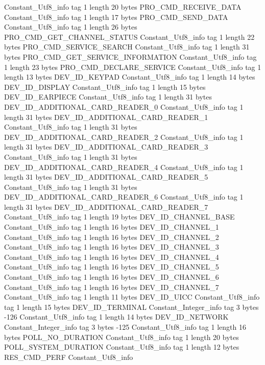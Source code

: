 {{{		}
		Constant_Utf8_info {
			tag	1
			length	20
			bytes	PRO_CMD_RECEIVE_DATA
		}
		Constant_Utf8_info {
			tag	1
			length	17
			bytes	PRO_CMD_SEND_DATA
		}
		Constant_Utf8_info {
			tag	1
			length	26
			bytes	PRO_CMD_GET_CHANNEL_STATUS
		}
		Constant_Utf8_info {
			tag	1
			length	22
			bytes	PRO_CMD_SERVICE_SEARCH
		}
		Constant_Utf8_info {
			tag	1
			length	31
			bytes	PRO_CMD_GET_SERVICE_INFORMATION
		}
		Constant_Utf8_info {
			tag	1
			length	23
			bytes	PRO_CMD_DECLARE_SERVICE
		}
		Constant_Utf8_info {
			tag	1
			length	13
			bytes	DEV_ID_KEYPAD
		}
		Constant_Utf8_info {
			tag	1
			length	14
			bytes	DEV_ID_DISPLAY
		}
		Constant_Utf8_info {
			tag	1
			length	15
			bytes	DEV_ID_EARPIECE
		}
		Constant_Utf8_info {
			tag	1
			length	31
			bytes	DEV_ID_ADDITIONAL_CARD_READER_0
		}
		Constant_Utf8_info {
			tag	1
			length	31
			bytes	DEV_ID_ADDITIONAL_CARD_READER_1
		}
		Constant_Utf8_info {
			tag	1
			length	31
			bytes	DEV_ID_ADDITIONAL_CARD_READER_2
		}
		Constant_Utf8_info {
			tag	1
			length	31
			bytes	DEV_ID_ADDITIONAL_CARD_READER_3
		}
		Constant_Utf8_info {
			tag	1
			length	31
			bytes	DEV_ID_ADDITIONAL_CARD_READER_4
		}
		Constant_Utf8_info {
			tag	1
			length	31
			bytes	DEV_ID_ADDITIONAL_CARD_READER_5
		}
		Constant_Utf8_info {
			tag	1
			length	31
			bytes	DEV_ID_ADDITIONAL_CARD_READER_6
		}
		Constant_Utf8_info {
			tag	1
			length	31
			bytes	DEV_ID_ADDITIONAL_CARD_READER_7
		}
		Constant_Utf8_info {
			tag	1
			length	19
			bytes	DEV_ID_CHANNEL_BASE
		}
		Constant_Utf8_info {
			tag	1
			length	16
			bytes	DEV_ID_CHANNEL_1
		}
		Constant_Utf8_info {
			tag	1
			length	16
			bytes	DEV_ID_CHANNEL_2
		}
		Constant_Utf8_info {
			tag	1
			length	16
			bytes	DEV_ID_CHANNEL_3
		}
		Constant_Utf8_info {
			tag	1
			length	16
			bytes	DEV_ID_CHANNEL_4
		}
		Constant_Utf8_info {
			tag	1
			length	16
			bytes	DEV_ID_CHANNEL_5
		}
		Constant_Utf8_info {
			tag	1
			length	16
			bytes	DEV_ID_CHANNEL_6
		}
		Constant_Utf8_info {
			tag	1
			length	16
			bytes	DEV_ID_CHANNEL_7
		}
		Constant_Utf8_info {
			tag	1
			length	11
			bytes	DEV_ID_UICC
		}
		Constant_Utf8_info {
			tag	1
			length	15
			bytes	DEV_ID_TERMINAL
		}
		Constant_Integer_info {
			tag	3
			bytes	-126
		}
		Constant_Utf8_info {
			tag	1
			length	14
			bytes	DEV_ID_NETWORK
		}
		Constant_Integer_info {
			tag	3
			bytes	-125
		}
		Constant_Utf8_info {
			tag	1
			length	16
			bytes	POLL_NO_DURATION
		}
		Constant_Utf8_info {
			tag	1
			length	20
			bytes	POLL_SYSTEM_DURATION
		}
		Constant_Utf8_info {
			tag	1
			length	12
			bytes	RES_CMD_PERF
		}
		Constant_Utf8_info {
}}}
